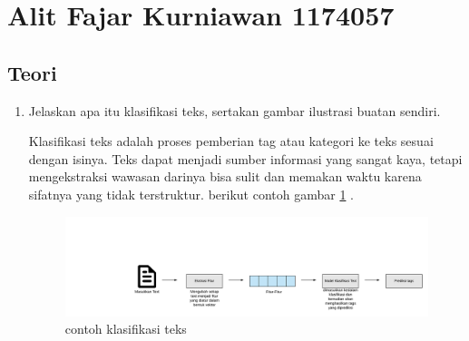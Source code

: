 \section{Alit Fajar Kurniawan 1174057}

\subsection{Teori}
\begin{enumerate}
\item Jelaskan apa itu klasifikasi teks, sertakan gambar ilustrasi buatan sendiri.
\par Klasiﬁkasi teks adalah proses pemberian tag atau kategori ke teks sesuai dengan isinya. Teks dapat menjadi sumber informasi yang sangat kaya, tetapi mengekstraksi wawasan darinya bisa sulit dan memakan waktu karena sifatnya yang tidak terstruktur. berikut contoh gambar \ref{klasifikasi teks} .
\begin{figure}[H]
\centering
\includegraphics[scale=0.4]{figures/1174057/chapter4/1.png}
\caption{contoh klasifikasi teks}
\label{klasifikasi teks}
\end{figure}


\end{enumerate}
